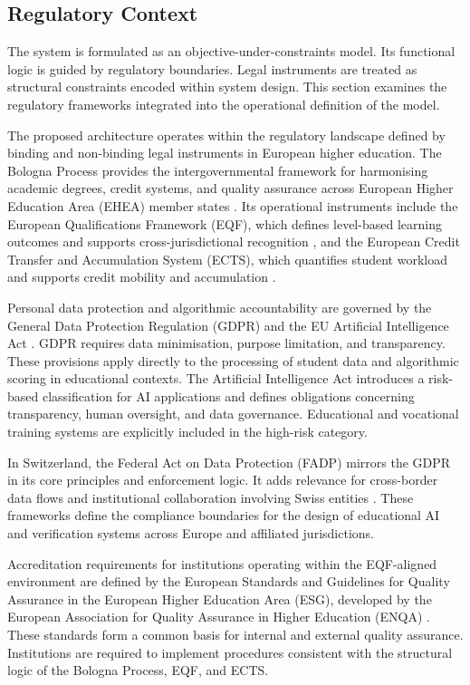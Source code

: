 \documentclass[oneside,10pt]{swissi}
\begin{document}
\subsection{Regulatory Context}

The system is formulated as an objective-under-constraints model. Its functional logic is guided by regulatory boundaries. Legal instruments are treated as structural constraints encoded within system design. This section examines the regulatory frameworks integrated into the operational definition of the model.

The proposed architecture operates within the regulatory landscape defined by binding and non-binding legal instruments in European higher education. The Bologna Process provides the intergovernmental framework for harmonising academic degrees, credit systems, and quality assurance across European Higher Education Area (EHEA) member states \cite{ehea2020bologna}. Its operational instruments include the European Qualifications Framework (EQF), which defines level-based learning outcomes and supports cross-jurisdictional recognition \cite{ec2017eqf}, and the European Credit Transfer and Accumulation System (ECTS), which quantifies student workload and supports credit mobility and accumulation \cite{ec2015ects}.

Personal data protection and algorithmic accountability are governed by the General Data Protection Regulation (GDPR) \cite{eu2016gdpr} and the EU Artificial Intelligence Act \cite{eu2024aiact}. GDPR requires data minimisation, purpose limitation, and transparency. These provisions apply directly to the processing of student data and algorithmic scoring in educational contexts. The Artificial Intelligence Act introduces a risk-based classification for AI applications and defines obligations concerning transparency, human oversight, and data governance. Educational and vocational training systems are explicitly included in the high-risk category.

In Switzerland, the Federal Act on Data Protection (FADP) mirrors the GDPR in its core principles and enforcement logic. It adds relevance for cross-border data flows and institutional collaboration involving Swiss entities \cite{ch2020fadp}. These frameworks define the compliance boundaries for the design of educational AI and verification systems across Europe and affiliated jurisdictions.

Accreditation requirements for institutions operating within the EQF-aligned environment are defined by the European Standards and Guidelines for Quality Assurance in the European Higher Education Area (ESG), developed by the European Association for Quality Assurance in Higher Education (ENQA) \cite{enqa2015esg}. These standards form a common basis for internal and external quality assurance. Institutions are required to implement procedures consistent with the structural logic of the Bologna Process, EQF, and ECTS.
\end{document}
